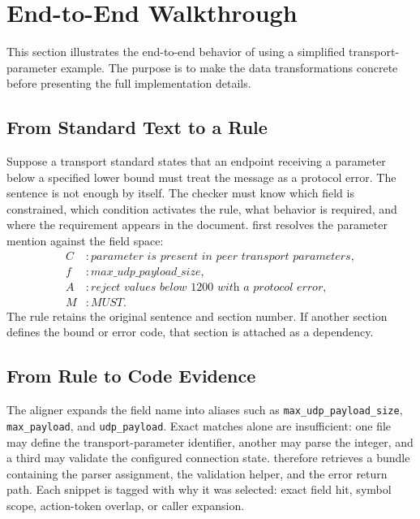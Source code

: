 \section{End-to-End Walkthrough}
\label{sec:walkthrough}

This section illustrates the end-to-end behavior of \tool{} using a simplified
transport-parameter example. The purpose is to make the data transformations
concrete before presenting the full implementation details.

\subsection{From Standard Text to a Rule}

Suppose a transport standard states that an endpoint receiving a parameter
below a specified lower bound must treat the message as a protocol error. The
sentence is not enough by itself. The checker must know which field is
constrained, which condition activates the rule, what behavior is required, and
where the requirement appears in the document. \tool{} first resolves the
parameter mention against the field space:
\[
\begin{aligned}
C &: \textit{parameter is present in peer transport parameters},\\
f &: \textit{max\_udp\_payload\_size},\\
A &: \textit{reject values below 1200 with a protocol error},\\
M &: \textit{MUST}.
\end{aligned}
\]
The rule retains the original sentence and section number. If another section
defines the bound or error code, that section is attached as a dependency.

\subsection{From Rule to Code Evidence}

The aligner expands the field name into aliases such as
\texttt{max\_udp\_payload\_size}, \texttt{max\_payload}, and
\texttt{udp\_payload}. Exact matches alone are insufficient: one file may define
the transport-parameter identifier, another may parse the integer, and a third
may validate the configured connection state. \tool{} therefore retrieves a
bundle containing the parser assignment, the validation helper, and the error
return path. Each snippet is tagged with why it was selected: exact field hit,
symbol scope, action-token overlap, or caller expansion.

